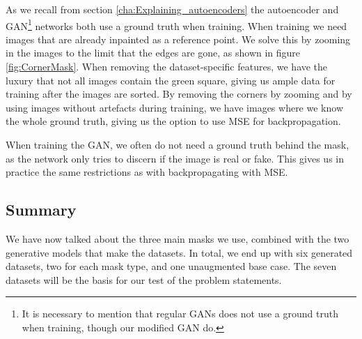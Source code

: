 As we recall from section \ref{cha:Explaining_autoencoders} the autoencoder and GAN\footnote{It is necessary to mention that regular GANs does not use a ground truth when training, though our modified GAN do.} networks both use a ground truth when training.
When training we need images that are already inpainted as a reference point. We solve this by zooming in the images to the limit that the edges are gone, as shown in figure \ref{fig:CornerMask}. When removing the dataset-specific features, we have the luxury that not all images contain the green square, giving us ample data for training after the images are sorted.
By removing the corners by zooming and by using images without artefacts during training, we have images where we know the whole ground truth, giving us the option to use MSE for backpropagation.


When training the GAN, we often do not need a ground truth behind the mask, as the network only tries to discern if the image is real or fake. This gives us in practice the same restrictions as with backpropagating with MSE.

\subsection{Summary}
We have now talked about the three main masks we use, combined with the two generative models that make the datasets.
In total, we end up with six generated datasets, two for each mask type, and one unaugmented base case.
The seven datasets will be the basis for our test of the problem statements. 



